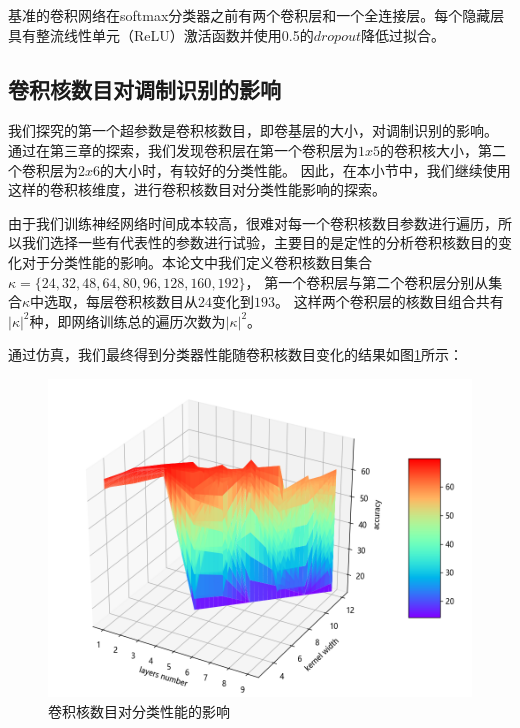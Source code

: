 基准的卷积网络在softmax分类器之前有两个卷积层和一个全连接层。每个隐藏层具有整流线性单元（ReLU）激活函数并使用0.5的$dropout$降低过拟合。\par
\subsection{卷积核数目对调制识别的影响}
我们探究的第一个超参数是卷积核数目，即卷基层的大小，对调制识别的影响。
通过在第三章的探索，我们发现卷积层在第一个卷积层为$1x5$的卷积核大小，第二个卷积层为$2x6$的大小时，有较好的分类性能。
因此，在本小节中，我们继续使用这样的卷积核维度，进行卷积核数目对分类性能影响的探索。\par

由于我们训练神经网络时间成本较高，很难对每一个卷积核数目参数进行遍历，所以我们选择一些有代表性的参数进行试验，主要目的是定性的分析卷积核数目的变化对于分类性能的影响。本论文中我们定义卷积核数目集合$\kappa =\{24, 32, 48, 64, 80, 96, 128, 160, 192\}$，
第一个卷积层与第二个卷积层分别从集合$\kappa$中选取，每层卷积核数目从$24$变化到$193$。
这样两个卷积层的核数目组合共有$|\kappa|^2$种，即网络训练总的遍历次数为$|\kappa|^2$。\par
通过仿真，我们最终得到分类器性能随卷积核数目变化的结果如图\ref{sec:fig_5_1}所示：\par

\begin{figure}[!h]
	\centering
	\includegraphics[scale=1.1]{figures/chapter_5/fig_5_1}
	\caption{卷积核数目对分类性能的影响} \label{sec:fig_5_1}
\end{figure}

